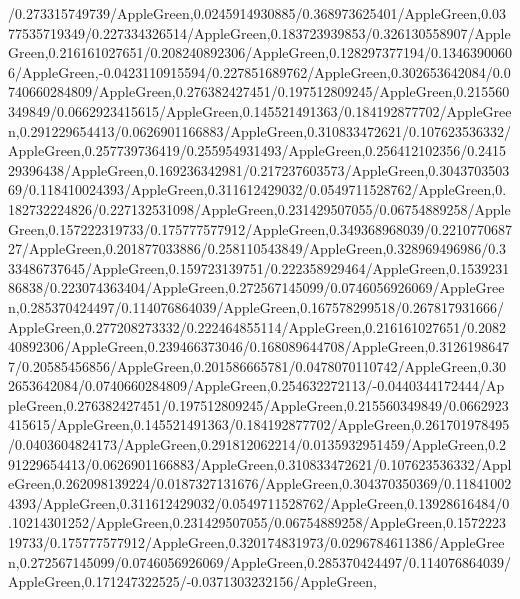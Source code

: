 {\begin{tikzternal}
{/0.273315749739/AppleGreen,0.0245914930885/0.368973625401/AppleGreen,0.0377535719349/0.227334326514/AppleGreen,0.183723939853/0.326130558907/AppleGreen,0.216161027651/0.208240892306/AppleGreen,0.128297377194/0.13463900606/AppleGreen,-0.0423110915594/0.227851689762/AppleGreen,0.302653642084/0.0740660284809/AppleGreen,0.276382427451/0.197512809245/AppleGreen,0.215560349849/0.0662923415615/AppleGreen,0.145521491363/0.184192877702/AppleGreen,0.291229654413/0.0626901166883/AppleGreen,0.310833472621/0.107623536332/AppleGreen,0.257739736419/0.255954931493/AppleGreen,0.256412102356/0.241529396438/AppleGreen,0.169236342981/0.217237603573/AppleGreen,0.304370350369/0.118410024393/AppleGreen,0.311612429032/0.0549711528762/AppleGreen,0.182732224826/0.227132531098/AppleGreen,0.231429507055/0.06754889258/AppleGreen,0.157222319733/0.175777577912/AppleGreen,0.349368968039/0.221077068727/AppleGreen,0.201877033886/0.258110543849/AppleGreen,0.328969496986/0.333486737645/AppleGreen,0.159723139751/0.222358929464/AppleGreen,0.153923186838/0.223074363404/AppleGreen,0.272567145099/0.0746056926069/AppleGreen,0.285370424497/0.114076864039/AppleGreen,0.167578299518/0.267817931666/AppleGreen,0.277208273332/0.222464855114/AppleGreen,0.216161027651/0.208240892306/AppleGreen,0.239466373046/0.168089644708/AppleGreen,0.31261986477/0.20585456856/AppleGreen,0.201586665781/0.0478070110742/AppleGreen,0.302653642084/0.0740660284809/AppleGreen,0.254632272113/-0.0440344172444/AppleGreen,0.276382427451/0.197512809245/AppleGreen,0.215560349849/0.0662923415615/AppleGreen,0.145521491363/0.184192877702/AppleGreen,0.261701978495/0.0403604824173/AppleGreen,0.291812062214/0.0135932951459/AppleGreen,0.291229654413/0.0626901166883/AppleGreen,0.310833472621/0.107623536332/AppleGreen,0.262098139224/0.0187327131676/AppleGreen,0.304370350369/0.118410024393/AppleGreen,0.311612429032/0.0549711528762/AppleGreen,0.13928616484/0.10214301252/AppleGreen,0.231429507055/0.06754889258/AppleGreen,0.157222319733/0.175777577912/AppleGreen,0.320174831973/0.0296784611386/AppleGreen,0.272567145099/0.0746056926069/AppleGreen,0.285370424497/0.114076864039/AppleGreen,0.171247322525/-0.0371303232156/AppleGreen,
}
\end{tikzternal}}
